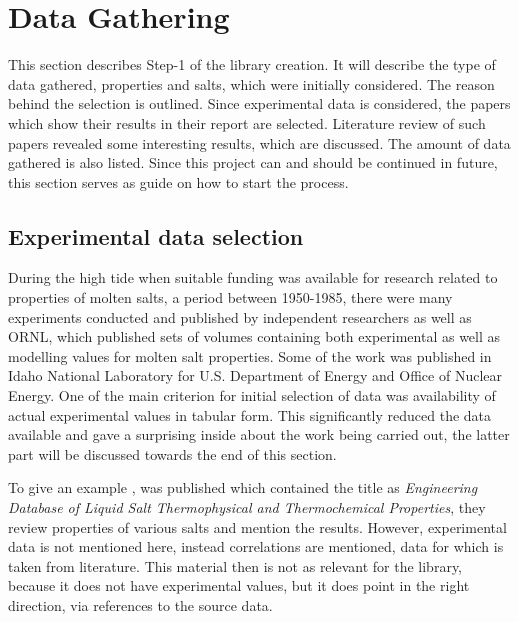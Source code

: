 \section{Data Gathering}
This section describes Step-1 of the library creation. It will describe the type of data gathered, properties and salts, which were initially considered. The reason behind the selection is outlined. Since experimental data is considered, the papers which show their results in their report are selected. Literature review of such papers revealed some interesting results, which are discussed. The amount of data gathered is also listed. Since this project can and should be continued in future, this section serves as guide on how to start the process. \newline

\subsection{Experimental data selection }

During the high tide when suitable funding was available for research related to properties of molten salts, a period between 1950-1985, there were many experiments conducted and published by independent researchers as well as ORNL, which published sets of volumes containing both experimental as well as modelling values for molten salt properties. Some of the work was published in Idaho National Laboratory for U.S. Department of Energy and Office of Nuclear Energy. One of the main criterion for initial selection of data was availability of actual experimental values in tabular form. This significantly reduced the data available and gave a surprising inside about the work being carried out, the latter part will be discussed towards the end of this section. \newline

To give an example \cite{osti_980801}, was published which contained the title as \textit{Engineering Database of Liquid Salt Thermophysical and Thermochemical Properties}, they review properties of various salts and mention the results. However, experimental data is not mentioned here, instead correlations are mentioned, data for which is taken from literature. This material then is not as relevant for the library, because it does not have experimental values, but it does point in the right direction, via references to the source data. \newline

